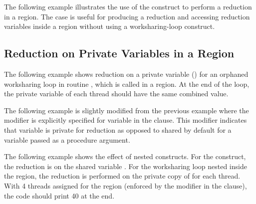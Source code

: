 The following example illustrates the use of the  construct 
to perform a reduction in a  region. The case is useful for 
producing a reduction and accessing reduction variables inside a  region 
without using a worksharing-loop construct.

\clearpage


\subsection{Reduction on Private Variables in a  Region}
\label{subsec:priv_reduction}

The following example shows reduction on a private variable ()
for an orphaned worksharing loop in routine ,
which is called in a  region.
At the end of the loop, the private variable of each thread should have the same combined value.

The following example is slightly modified from the previous example 
where the  modifier is explicitly specified
for variable  in the  clause.
This modifier indicates that variable  is private
for reduction as opposed to shared by default for a variable
passed as a procedure argument.
\clearpage

The following example shows the effect of nested  constructs.
For the  construct, the reduction is on the shared variable
.  For the worksharing loop nested inside the 
region, the reduction is performed on the private copy of 
for each thread.
With 4 threads assigned for the  region
(enforced by the  modifier in the  clause),
the code should print 40 at the end.

